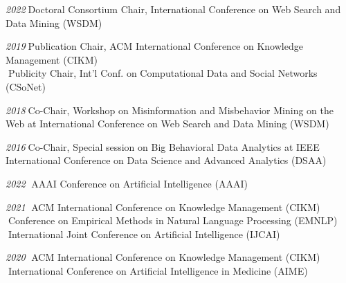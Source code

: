 \documentclass[10pt]{article}
\newenvironment{myindentpar}[1]%
{\begin{list}{}%
         {\setlength{\leftmargin}{#1}}%
         \item[]%
}
{\end{list}}
\newcounter{list}
\begin{document}
\begin{myindentpar}{0.75cm}
{\small

\hspace{-0.75cm}\textit{2022}\textcolor{white}{.}Doctoral Consortium Chair, International Conference on Web Search and Data Mining (WSDM)

\hspace{-0.75cm}\textit{2019}\textcolor{white}{.}Publication Chair, ACM International Conference on Knowledge Management (CIKM) \\
\textcolor{white}{.}Publicity Chair, Int'l Conf. on Computational Data and Social Networks (CSoNet)

\hspace{-0.75cm}\textit{2018}\textcolor{white}{.}Co-Chair, Workshop on Misinformation and Misbehavior Mining on the Web at International Conference on Web Search and Data Mining (WSDM)

\hspace{-0.75cm}\textit{2016}\textcolor{white}{.}Co-Chair, Special session on Big Behavioral Data Analytics at IEEE International Conference on Data Science and Advanced Analytics (DSAA)

}

\hspace{-0.75cm}{\bf Senior Program Committee / Area Chair}

{\small

\hspace{-0.75cm}\textit{2022}
\textcolor{white}{.}AAAI Conference on Artificial Intelligence (AAAI)

\hspace{-0.75cm}\textit{2021}
\textcolor{white}{.}ACM International Conference on Knowledge Management (CIKM) \\
\textcolor{white}{.}Conference on Empirical Methods in Natural Language Processing (EMNLP) \\
\textcolor{white}{.}International Joint Conference on Artificial Intelligence (IJCAI)

\hspace{-0.75cm}\textit{2020}
\textcolor{white}{.}ACM International Conference on Knowledge Management (CIKM) \\
\textcolor{white}{.}International Conference on Artificial Intelligence in Medicine (AIME)

}

\hspace{-0.75cm}{\bf Program Committee}

{\small

}
\end{myindentpar}
\end{document}
